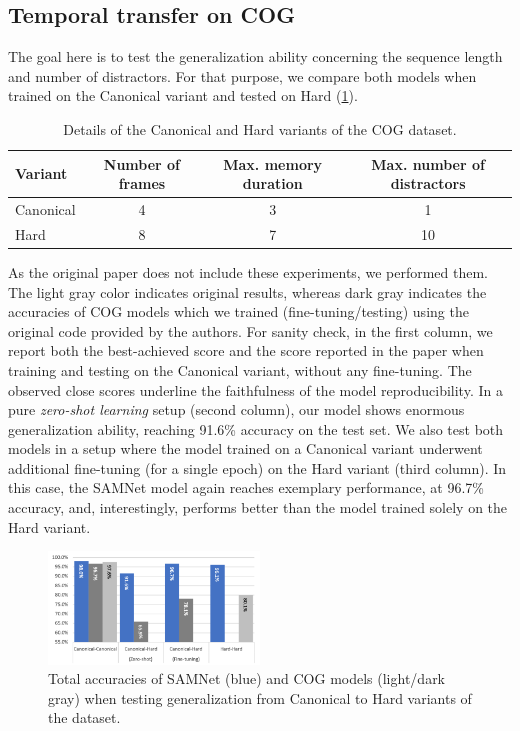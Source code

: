 \subsection{Temporal transfer on COG}
\label{sec:temporal}


The goal here is to test the generalization ability concerning the sequence length and number of distractors.
For that purpose, we compare both models when trained on the Canonical variant and tested on Hard (\cref{fig:samnet_cog_overall_transfer}).

\begin{table}[ht]
	\centering
	\begin{adjustbox}{width=0.45\textwidth}
		\begin{tabular}{lccc}
			\toprule
			Variant	&	Number of frames	&	Max. memory duration	&	Max. number of distractors \\ 
			\midrule
			Canonical & 4 & 3 & 1\\	
			Hard  & 8 & 7 & 10\\
			\bottomrule	
		\end{tabular}
	\end{adjustbox}
	\caption{Details of the Canonical and Hard variants of the COG dataset.}
	\label{tab:cog_variants}
\end{table}\vspace{5pt}

As the original paper does not include these experiments, we performed them. The light gray color indicates original results, whereas dark gray indicates the accuracies of COG models which we trained (fine-tuning/testing) using the original code provided by the authors.
For sanity check, in the first column, we report both the best-achieved score and the score reported in the paper when training and testing on the Canonical variant, without any fine-tuning. The observed close scores underline the faithfulness of the model reproducibility.
In a pure \textit{zero-shot learning} setup (second column), our model shows enormous generalization ability, reaching 91.6\% accuracy on the test set.
We also test both models in a setup where the model trained on a Canonical variant underwent additional fine-tuning (for a single epoch) on the Hard variant (third column).
In this case, the SAMNet model again reaches exemplary performance, at 96.7\% accuracy, and, interestingly, performs better than the model trained solely on the Hard variant.

\begin{figure}[htb]
	\centering
	\includegraphics[width=0.5\textwidth]{img/results/samnet_cog_overall_transfer.png}
	\caption{Total accuracies of SAMNet (blue) and COG models (light/dark gray) when testing generalization from Canonical to Hard variants of the dataset.}
	\label{fig:samnet_cog_overall_transfer}
\end{figure}


